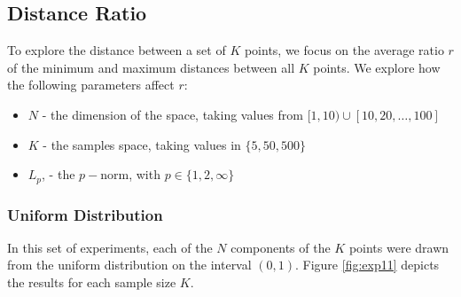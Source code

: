 \documentclass{article}
\begin{document}
\subsection{Distance Ratio}
To explore the distance between a set of $K$ points, we focus on the average ratio $r$ of the minimum and maximum distances between all $K$ points. We explore how the following parameters affect $r$:
\begin{itemize}
\item $N$ - the dimension of the space, taking values from $[1,10)\cup[10,20,\ldots,100]$
\item $K$ - the samples space, taking values in $\{5,50,500\}$
\item $L_p$, - the $p-$norm, with $p\in\{1,2,\infty\}$
\end{itemize}
\subsubsection{Uniform Distribution}
In this set of experiments, each of the $N$ components of the $K$ points were drawn from the uniform distribution on the interval $(0,1)$. Figure \ref{fig:exp11} depicts the results for each sample size $K$.
\end{document}

